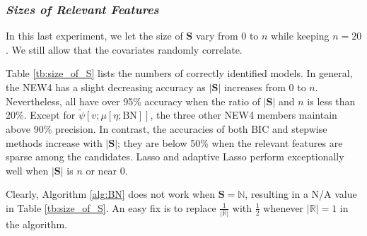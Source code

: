 \documentclass[a4paper,12pt]{article}
\begin{document}
\subsubsection{\textit{Sizes of Relevant Features}}
\noindent In this last experiment, we let the size of $\mathbf{S}$ vary from $0$ to $n$ while keeping $n=20$.
We still allow that the covariates randomly correlate.

Table \ref{tb:size_of_S} lists the numbers of correctly identified models.
In general, the NEW4 has a slight decreasing accuracy as $|\mathbf{S}|$ increases from $0$ to $n$.
Nevertheless, all have over 95\% accuracy when the ratio of $|\mathbf{S}|$ and $n$ is less than 20\%.
Except for $\tilde\psi[v;\mu[\eta;\mathrm{BN}]]$, the three other NEW4 members maintain above 90\% precision.
In contrast, the accuracies of both BIC and stepwise methods increase with $|\mathbf{S}|$;
they are below 50\% when the relevant features are sparse among the candidates.
Lasso and adaptive Lasso perform exceptionally well when $|\mathbf{S}|$ is $n$ or near $0$. 

Clearly, Algorithm \ref{alg:BN} does not work when $\mathbf{S}=\mathbb{N}$, resulting in a N/A value in Table \ref{tb:size_of_S}. 
An easy fix is to replace $\frac{1}{|\mathbb{R}|}$ with $\frac{1}{2}$ whenever $|\mathbb{R}|=1$ in the algorithm.
\end{document}

